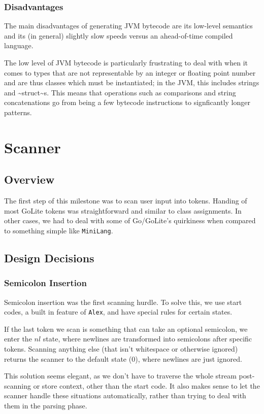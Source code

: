 \documentclass[11pt]{article}
\begin{document}
\subsubsection{Disadvantages}
The main disadvantages of generating JVM bytecode are its low-level
semantics and its (in general) slightly slow speeds versus an
ahead-of-time compiled language.

The low level of JVM bytecode is particularly frustrating to deal
with when it comes to types that are not representable by an
integer or floating point number and are thus classes which must be
instantiated; in the JVM, this includes strings and \textasciitilde{}struct\textasciitilde{}s. This
means that operations such as comparisons and string concatenations
go from being a few bytecode instructions to signficantly longer
patterns.
\section{Scanner}
\subsection{Overview}
The first step of this milestone was to scan user input into
tokens. Handing of most GoLite tokens was straightforward and
similar to class assignments. In other cases, we had to deal with
some of Go/GoLite's quirkiness when compared to something simple
like \texttt{MiniLang}.

\subsection{Design Decisions}
\subsubsection{Semicolon Insertion}
Semicolon insertion was the first scanning hurdle. To solve
this, we use start codes, a built in feature of \texttt{Alex}, and have
special rules for certain states.

If the last token we scan is something that can take an optional
semicolon, we enter the \(nl\) state, where newlines are transformed into
semicolons after specific tokens. Scanning anything else (that isn't
whitespace or otherwise ignored) returns the scanner to the default
state (\(0\)), where newlines are just ignored.

This solution seems elegant, as we don't have to traverse
the whole stream post-scanning or store context, other than the
start code. It also makes sense to let the scanner handle these
situations automatically, rather than trying to deal with them
in the parsing phase.
\end{document}

